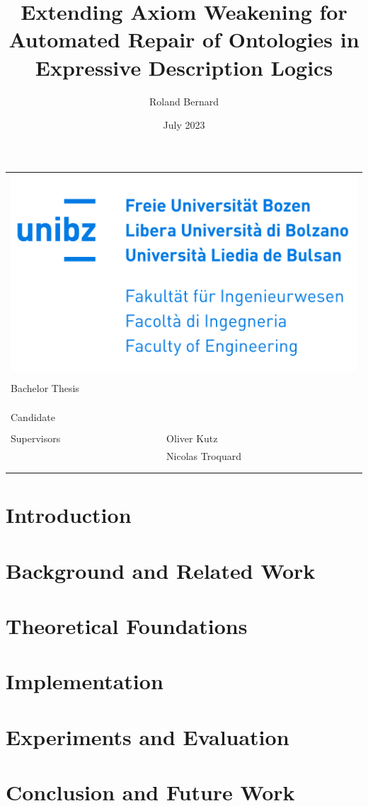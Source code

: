 \documentclass[10pt,a4paper]{report}
\title{Extending Axiom Weakening for Automated Repair of Ontologies in Expressive Description Logics}
\author{Roland Bernard}
\date{July 2023}
\makeatletter
\theoremstyle{plain}
\theoremstyle{definition}
\theoremstyle{remark}
\def\maketitle{
    \begin{tabular}{ll}
        \multicolumn{2}{r}{\includegraphics[width=0.5\linewidth]{resources/unibz-logo.png}} \\
        \vspace*{40mm} \\
        \multicolumn{2}{l}{\raggedright Bachelor Thesis} \\
        \vspace*{1mm} \\
        \multicolumn{2}{p{\linewidth}}{\raggedright \huge \bf \@title} \\
        \vspace*{30mm} \\
        Candidate   & \@author \\
        \vspace*{5mm} \\
        Supervisors & Oliver Kutz \\
                    & Nicolas Troquard \\
        \vspace*{20mm} \\
        \multicolumn{2}{p{\linewidth}}{\@date}
    \end{tabular}
}
\makeatother
\begin{document}
\maketitle

\begin{abstract}
    
\end{abstract}

\tableofcontents

\begingroup
\renewcommand{\abstractname}{Acknowledgements}
\begin{abstract}
    
\end{abstract}
\endgroup

\chapter{Introduction} \label{introduction}



\chapter{Background and Related Work} \label{background}



\chapter{Theoretical Foundations} \label{theory}



\chapter{Implementation} \label{implementation}



\chapter{Experiments and Evaluation} \label{evaluation}



\chapter{Conclusion and Future Work} \label{conclusion}
\end{document}
